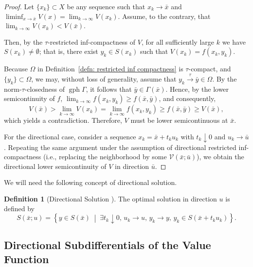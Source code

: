 \documentclass[12pt,twoside,reqno]{amsart}
\theoremstyle{definition}
\newtheorem{definition}[theorem]{Definition}
\numberwithin{equation}{section}
\begin{document}
\begin{proof}
Let \( \{x_k\} \subset X \) be any sequence such that \( x_k \to \bar{x} \) and $\liminf_{x \to \bar{x}} V(x) = \lim_{k \to \infty} V(x_k)$. 
Assume, to the contrary, that $\lim_{k \to \infty} V(x_k) < V(\bar{x})$. 

Then, by the \(\tau\)-restricted inf-compactness of \( V \), for all sufficiently large \( k \) we have \( S(x_k) \neq \emptyset \); that is, there exist \( y_k \in S(x_k) \) such that \( V(x_k) = f(x_k, y_k) \).  

Because \( \Omega \) in Definition~\ref{defn: restricted inf compactness} is \(\tau\)-compact, and \( \{y_k\} \subset \Omega \), we may, without loss of generality, assume that \( y_k \xrightarrow{\tau} \bar{y} \in \Omega \).  
By the norm-\(\tau\)-closedness of \( \operatorname{gph}\Gamma \), it follows that \( \bar{y} \in \Gamma(\bar{x}) \).  
Hence, by the lower semicontinuity of $f$, $\lim_{k \to \infty} f(x_k, y_k) \geq f(\bar{x}, \bar{y})$, and consequently,                                
\[
V(\bar{x}) > \lim_{k \to \infty} V(x_k) = \lim_{k \to \infty} f(x_k, y_k) 
    \geq f(\bar{x}, \bar{y}) \geq V(\bar{x}),\]
which yields a contradiction. 
Therefore, \( V \) must be lower semicontinuous at \( \bar{x} \).

For the directional case, consider a sequence \( x_k = \bar{x} + t_k u_k \) with \( t_k \downarrow 0 \) and \( u_k \to \bar{u} \).  
Repeating the same argument under the assumption of directional restricted inf-compactness (i.e., replacing the neighborhood by some \( \mathcal{V}(\bar{x}; \bar{u}) \)), we obtain the directional lower semicontinuity of \( V \) in direction \( \bar{u} \). 
\end{proof}

We will need the following concept of directional solution.
\begin{definition}[Directional Solution {\cite[Definition 4.5]{bai2022directional}}]
    The optimal solution in direction $u$ is defined by
    \begin{equation*}
        S(\bar{x}; u) = \left\{ y \in S(\bar{x}) \;\middle|\; \exists t_k \downarrow 0, \, u_k \to u, \, y_k \to y, \, y_k \in S(\bar{x} + t_k u_k) \right\}.
    \end{equation*}
\end{definition}


\subsection{Directional Subdifferentials of the Value Function}
\end{document}
